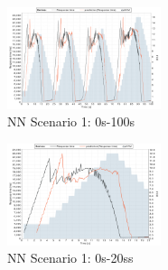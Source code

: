 \begin{figure}[ht]
	\begin{center}
		\includegraphics[width=0.40\textwidth]{chapters/chapter5/fig/NN1_1}
	\end{center}
	\caption{NN Scenario 1: 0s-100s}
	\label{fig:NN1_1}
\end{figure}

\begin{figure}[ht]
	\begin{center}
		\includegraphics[width=0.40\textwidth]{chapters/chapter5/fig/NN1_2}
	\end{center}
	\caption{NN Scenario 1: 0s-20ss}
	\label{fig:NN1_2}
\end{figure}

